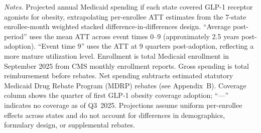 \begin{landscape}
\begin{minipage}{0.95\linewidth}
\footnotesize
\textit{Notes.}
Projected annual Medicaid spending if each state covered GLP-1 receptor agonists for obesity,
extrapolating per-enrollee ATT estimates from the 7-state enrollee-month weighted stacked
difference-in-differences design.
``Average post-period'' uses the mean ATT across event times 0--9 (approximately 2.5 years post-adoption).
``Event time 9'' uses the ATT at 9 quarters post-adoption, reflecting a more mature utilization level.
Enrollment is total Medicaid enrollment in September 2025 from CMS monthly enrollment reports.
Gross spending is total reimbursement before rebates.
Net spending subtracts estimated statutory Medicaid Drug Rebate Program (MDRP) rebates (see Appendix~B).
Coverage column shows the quarter of first GLP-1 obesity coverage adoption; ``---'' indicates no coverage as of Q3~2025.
Projections assume uniform per-enrollee effects across states and do not account for differences in
demographics, formulary design, or supplemental rebates.
\end{minipage}
\end{landscape}
